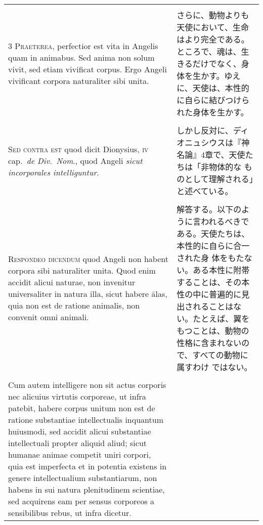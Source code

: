 \documentclass[10pt]{jsarticle} %
\begin{document}
\begin{longtable}{p{21em}p{21em}}
\\\\


{\scshape 3 Praeterea}, perfectior est vita in Angelis
quam in animabus. Sed anima non solum vivit, sed etiam vivificat
corpus. Ergo Angeli vivificant corpora naturaliter sibi unita.


&

さらに、動物よりも天使において、生命はより完全である。ところで、魂は、生
 きるだけでなく、身体を生かす。ゆえに、天使は、本性的に自らに結びつけら
 れた身体を生かす。

\\\\


 {\scshape Sed contra est} quod dicit Dionysius, {\scshape iv} cap.~{\itshape de
Div.~Nom}., quod Angeli {\itshape sicut incorporales intelliguntur}.


&

しかし反対に、ディオニュシウスは『神名論』4章で、天使たちは「非物体的な
 ものとして理解される」と述べている。


\\\\


{\scshape Respondeo dicendum} quod Angeli non habent
corpora sibi naturaliter unita. Quod enim accidit alicui naturae, non
invenitur universaliter in natura illa, sicut habere \={a}las, quia non est
de ratione animalis, non convenit omni animali. 


&

解答する。以下のように言われるべきである。天使たちは、本性的に自らに合一された身
体をもたない。ある本性に附帯することは、その本性の中に普遍的に見出されることはな
い。たとえば、翼をもつことは、動物の性格に含まれないので、すべての動物に属すわけ
ではない。

\\\\



Cum autem intelligere non sit actus corporis nec alicuius virtutis corporeae, ut
infra patebit, habere corpus unitum non est de ratione substantiae
intellectualis inquantum huiusmodi, sed accidit alicui substantiae intellectuali
propter aliquid aliud; sicut humanae animae competit uniri corpori, quia est
imperfecta et in potentia existens in genere intellectualium substantiarum, non
habens in sui natura plenitudinem scientiae, sed acquirens eam per sensus
corporeos a sensibilibus rebus, ut infra dicetur.


&


\end{longtable}
\end{document}
